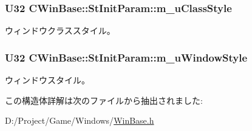 \subsubsection[{m\+\_\+u\+Class\+Style}]{\setlength{\rightskip}{0pt plus 5cm}U32 C\+Win\+Base\+::\+St\+Init\+Param\+::m\+\_\+u\+Class\+Style}\label{struct_c_win_base_1_1_st_init_param_a852e62af211b4fdadcb9e00b4097a9d7}


ウィンドウクラススタイル。 

\hypertarget{struct_c_win_base_1_1_st_init_param_a75626930e6ea598f595af0bc37f9eba7}{}
\subsubsection[{m\+\_\+u\+Window\+Style}]{\setlength{\rightskip}{0pt plus 5cm}U32 C\+Win\+Base\+::\+St\+Init\+Param\+::m\+\_\+u\+Window\+Style}\label{struct_c_win_base_1_1_st_init_param_a75626930e6ea598f595af0bc37f9eba7}


ウィンドウスタイル。 



この構造体詳解は次のファイルから抽出されました\+:\begin{DoxyCompactItemize}
\item 
D\+:/\+Project/\+Game/\+Windows/\hyperlink{_win_base_8h}{Win\+Base.\+h}\end{DoxyCompactItemize}

